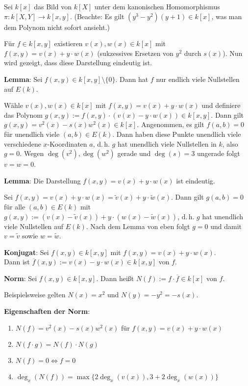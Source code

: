 \linie

Sei $k[x]$ das Bild von $k[X]$ unter dem kanonischen Homomorphismus
$\pi\colon k[X, Y] \to k[x, y]$.
(Beachte: Es gilt $(y^3 - y^2)(y + 1) \in k[x]$, was man dem Polynom nicht sofort ansieht.)

Für $f \in k[x, y]$ existieren $v(x), w(x) \in k[x]$ mit $f(x, y) = v(x) + y \cdot w(x)$
(sukzessives Ersetzen von $y^2$ durch $s(x)$).
Nun wird gezeigt, dass diese Darstellung eindeutig ist.

\textbf{Lemma}:
Sei $f(x, y) \in k[x, y] \setminus \{0\}$.
Dann hat $f$ nur endlich viele Nullstellen auf $E(k)$.

\begin{Beweis}
    Wähle $v(x), w(x) \in k[x]$ mit $f(x, y) = v(x) + y \cdot w(x)$
    und definiere das Polynom $g(x, y) := f(x, y) \cdot (v(x) - y \cdot w(x)) \in k[x, y]$.
    Dann gilt $g(x, y) = v^2(x) - s(x) w^2(x) \in k[x]$.
    Angenommen, es gilt $f(a, b) = 0$ für unendlich viele $(a, b) \in E(k)$.
    Dann haben diese Punkte unendlich viele verschiedene $x$-Koordinaten $a$, d.\,h.
    $g$ hat unendlich viele Nullstellen in $k$, also $g = 0$.
    Wegen $\deg(v^2), \deg(w^2)$ gerade und $\deg(s) = 3$ ungerade folgt $v = w = 0$.
\end{Beweis}

\textbf{Lemma}:
Die Darstellung $f(x, y) = v(x) + y \cdot w(x)$ ist eindeutig.

\begin{Beweis}
    Sei $f(x, y) = v(x) + y \cdot w(x) = \widetilde{v}(x) + y \cdot \widetilde{w}(x)$.
    Dann gilt $g(a, b) = 0$ für alle $(a, b) \in E(k)$
    mit $g(x, y) := (v(x) - \widetilde{v}(x)) + y \cdot (w(x) - \widetilde{w}(x))$,
    d.\,h. $g$ hat unendlich viele Nullstellen auf $E(k)$.
    Nach dem Lemma von eben folgt $g = 0$ und damit $v = \widetilde{v}$ sowie $w = \widetilde{w}$.
\end{Beweis}

\linie

\textbf{Konjugat}:
Sei $f(x, y) \in k[x, y]$ mit $f(x, y) = v(x) + y \cdot w(x)$.\\
Dann ist $\overline{f}(x, y) := v(x) - y \cdot w(x) \in k[x, y]$  von $f$.

\textbf{Norm}:
Sei $f(x, y) \in k[x, y]$.
Dann heißt $N(f) := f \cdot \overline{f} \in k[x]$  von $f$.

Beispielsweise gelten $N(x) = x^2$ und $N(y) = -y^2 = -s(x)$.

\textbf{Eigenschaften der Norm}:
\begin{enumerate}
    \item
    $N(f) = v^2(x) - s(x) w^2(x)$ für $f(x, y) = v(x) + y \cdot w(x)$

    \item
    $N(f \cdot g) = N(f) \cdot N(g)$

    \item
    $N(f) = 0 \iff f = 0$

    \item
    $\deg_x(N(f)) = \max\{2\deg_x(v(x)), 3 + 2\deg_x(w(x))\}$
\end{enumerate}

